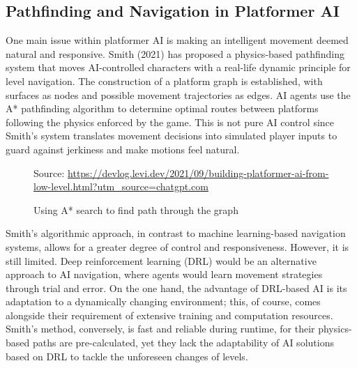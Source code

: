 \documentclass[12pt,oneside,openright,a4paper]{cpe-english-project}
\begin{document}
\subsection{Pathfinding and Navigation in Platformer AI}
One main issue within platformer AI is making an intelligent movement deemed natural and responsive. Smith (2021) has proposed a physics-based pathfinding system that moves AI-controlled characters with a real-life dynamic principle for level navigation. The construction of a platform graph is established, with surfaces as nodes and possible movement trajectories as edges. AI agents use the A* pathfinding algorithm to determine optimal routes between platforms following the physics enforced by the game. This is not pure AI control since Smith's system translates movement decisions into simulated player inputs to guard against jerkiness and make motions feel natural.\par
\begin{figure}[!h]
\centering
{}
\caption{Using A* search to find path through the graph}\label{fig:A*tofindPath}
Source:
\href{https://devlog.levi.dev/2021/09/building-platformer-ai-from-low-level.html?utm\_source=chatgpt.com}{https://devlog.levi.dev/2021/09/building-platformer-ai-from-low-level.html?utm\_source=chatgpt.com}  
\end{figure}
Smith's algorithmic approach, in contrast to machine learning-based navigation systems, allows for a greater degree of control and responsiveness. However, it is still limited. Deep reinforcement learning (DRL) would be an alternative approach to AI navigation, where agents would learn movement strategies through trial and error. On the one hand, the advantage of DRL-based AI is its adaptation to a dynamically changing environment; this, of course, comes alongside their requirement of extensive training and computation resources. Smith's method, conversely, is fast and reliable during runtime, for their physics-based paths are pre-calculated, yet they lack the adaptability of AI solutions based on DRL to tackle the unforeseen changes of levels.\par
\newpage
\end{document}
